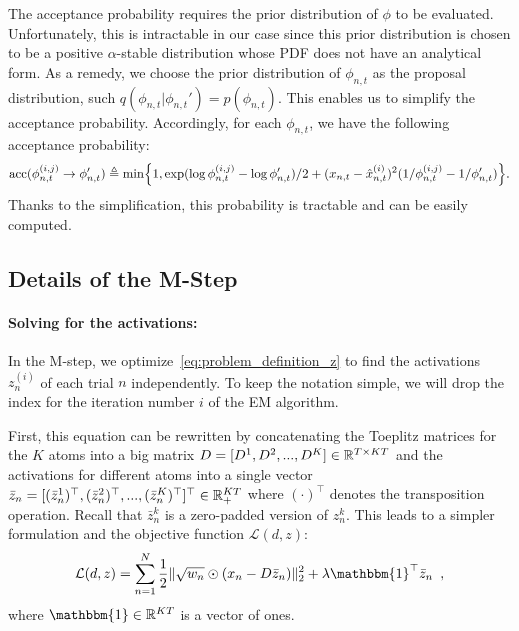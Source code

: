 The acceptance probability requires the prior distribution of $\phi$ to be evaluated. Unfortunately, this is intractable in our case since this prior distribution is chosen to be a positive $\alpha$-stable distribution whose PDF does not have an analytical form. As a remedy, we choose the prior distribution of $\phi_{n,t}$ as the proposal distribution, such $q(\phi_{n,t}|\phi_{n,t}') = p(\phi_{n,t})$. This enables us to simplify the acceptance probability. Accordingly, for each $\phi_{n,t}$, we have the following acceptance probability:
\begin{align}
  \text{acc}(\phi_{n,t}^{(i,j)} \rightarrow \phi_{n,t}' ) \triangleq \min  \Bigl\{1, \exp(\log \phi_{n,t}^{(i,j)} - \log \phi_{n,t}')/2 + (x_{n,t} - \hat{x}^{(i)}_{n,t})^2 (1/{\phi_{n,t}^{(i,j)}} - 1/{\phi_{n,t}'}) \Bigr\}.
\end{align}
Thanks to the simplification, this probability is tractable and can be easily computed. 

\subsection{Details of the M-Step}
\label{sec:m-step}
\paragraph{Solving for the activations: }
In the M-step, we optimize~\eqref{eq:problem_definition_z} to find the activations $z_n^{(i)}$ of each trial $n$ independently. To keep the notation simple, we will drop the index for the iteration number $i$ of the EM algorithm.

First, this equation can be rewritten by concatenating the Toeplitz matrices for the $K$ atoms into a big matrix $D = [D^1, D^2, ..., D^K] \in \mathbb{R}^{T \times KT}$ and the activations for different atoms into a single vector $\bar{z}_n = [(\bar{z}_n^1)^\top, (\bar{z}_n^2)^\top, ..., (\bar{z}_n^K)^\top]^\top \in \mathbb{R}^{KT}_+$ where $(\cdot)^\top$ denotes the transposition operation. Recall that $\bar{z}_n^k$ is a zero-padded version of $z_n^k$. This leads to a simpler formulation and the objective function $\mathcal{L}(d, z)$:
\begin{equation}
\mathcal{L}(d, z) = \sum_{n=1}^{N} \frac{1}{2}\|\sqrt{w_{n}} \odot (x_{n} - D \bar{z}_{n})\|_{2}^{2} + \lambda \mathbbm{1}^\top \bar{z}_{n} \enspace ,
\label{eq:problem_definition_d_simple}
\end{equation}
where $\mathbbm{1} \in \bbR^{KT}$ is a vector of ones.

